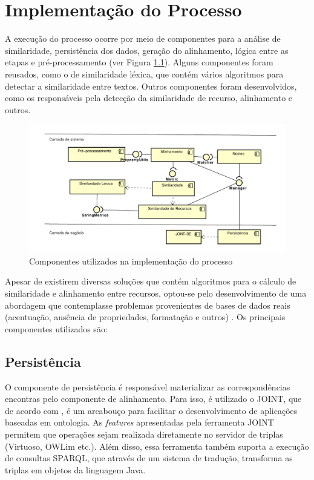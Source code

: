 \chapter{Implementação do Processo}
\label{cap:componentes}
A execução do processo ocorre por meio de componentes para a análise de similaridade, persistência dos dados, geração do alinhamento, lógica entre as etapas e pré-processamento (ver Figura \ref{fig:componentes}). Alguns componentes foram reusados, como o de similaridade léxica, que contém vários algoritmos para detectar a similaridade entre textos. Outros componentes foram desenvolvidos, como os responsáveis pela detecção da similaridade de recurso, alinhamento e outros.

\begin{figure}[!ht]
	\centering
	\includegraphics[width=1\textwidth]{./imagens/componentes.pdf}
    \caption{Componentes utilizados na implementação do processo}
	\label{fig:componentes}
\end{figure}

Apesar de existirem diversas soluções que contém algoritmos para o cálculo de similaridade e alinhamento entre recursos, optou-se pelo desenvolvimento de uma abordagem que contemplasse problemas provenientes de bases de dados reais (acentuação, ausência de propriedades, formatação e outros) \cite{castano2011ontology,ferrara2008towards}.
Os principais componentes utilizados são:

\section{Persistência}

O componente de persistência é responsável materializar as correspondências encontras pelo componente de alinhamento. Para isso, é utilizado o JOINT, que de acordo com , é um arcabouço para facilitar o desenvolvimento de aplicações baseadas em ontologia. As \textit{features} apresentadas pela ferramenta JOINT permitem que operações sejam realizada diretamente no servidor de triplas (Virtuoso, OWLim etc.). Além disso, essa ferramenta também suporta a execução de consultas SPARQL, que através de um sistema de tradução, transforma as triplas em objetos da linguagem Java.

